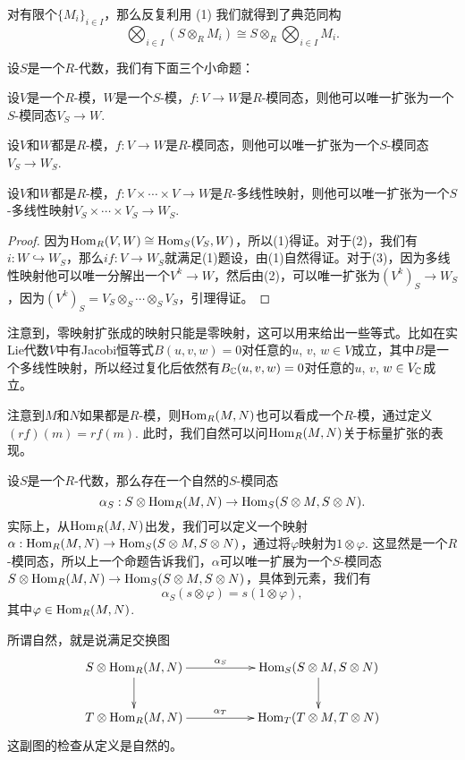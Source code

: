 对有限个$\{M_i\}_{i\in I}$，那么反复利用 (1) 我们就得到了典范同构
\[
	\bigotimes_{i\in I} \left(S\otimes_RM_i\right)\cong S\otimes_R\bigotimes_{i\in I} M_i.
\]

\begin{pro}
设$S$是一个$R$-代数，我们有下面三个小命题：
\begin{compactenum}[~~~(1)]
\item 设$V$是一个$R$-模，$W$是一个$S$-模，$f:V\to W$是$R$-模同态，则他可以唯一扩张为一个$S$-模同态$V_S\to W$.
\item 设$V$和$W$都是$R$-模，$f:V\to W$是$R$-模同态，则他可以唯一扩张为一个$S$-模同态$V_S\to W_S$.
\item 设$V$和$W$都是$R$-模，$f:V\times\cdots\times V\to W$是$R$-多线性映射，则他可以唯一扩张为一个$S$-多线性映射$V_S\times\cdots\times V_S\to W_S$.
\end{compactenum}
\end{pro}

\begin{proof} 
	因为$\operatorname{Hom}_R(V,W)\cong \operatorname{Hom}_S(V_S,W)$，所以(1)得证。对于(2)，我们有$i:W\hookrightarrow W_S$，那么$if:V\to W_S$就满足(1)题设，由(1)自然得证。对于(3)，因为多线性映射他可以唯一分解出一个$V^k\to W$，然后由(2)，可以唯一扩张为$(V^k)_S\to W_S$，因为$(V^k)_S=V_S\otimes_S \cdots\otimes_S V_S$，引理得证。
\end{proof}

注意到，零映射扩张成的映射只能是零映射，这可以用来给出一些等式。比如在实Lie代数$V$中有Jacobi恒等式$B(u,v,w)=0$对任意的$u$, $v$, $w\in V$成立，其中$B$是一个多线性映射，所以经过复化后依然有$B_{\mathbb{C}} (u,v,w)=0$对任意的$u$, $v$, $w\in V_{\mathbb{C}}$成立。

\para 注意到$M$和$N$如果都是$R$-模，则$\operatorname{Hom}_R(M,N)$也可以看成一个$R$-模，通过定义$(rf)(m)=rf(m)$. 此时，我们自然可以问$\operatorname{Hom}_R(M,N)$关于标量扩张的表现。

设$S$是一个$R$-代数，那么存在一个自然的$S$-模同态
\[
	\alpha_S:S\otimes\operatorname{Hom}_R(M,N)\to \operatorname{Hom}_S(S\otimes M,S\otimes N).
\]
实际上，从$\operatorname{Hom}_R(M,N)$出发，我们可以定义一个映射$\alpha:\operatorname{Hom}_R(M,N)\to \operatorname{Hom}_S(S\otimes M,S\otimes N)$，通过将$\varphi$映射为$1\otimes \varphi$. 这显然是一个$R$-模同态，所以上一个命题告诉我们，$\alpha$可以唯一扩展为一个$S$-模同态$S\otimes\operatorname{Hom}_R(M,N)\to \operatorname{Hom}_S(S\otimes M,S\otimes N)$，具体到元素，我们有
\[
	\alpha_S(s\otimes \varphi)=s(1\otimes \varphi),
\]
其中$\varphi\in \operatorname{Hom}_R(M,N)$.

所谓自然，就是说满足交换图
\[
\begin{xy}
	\xymatrix
	{
		S\otimes\Hom_R(M,N)\ar[rr]^-{\alpha_S}\ar[d]&&\Hom_S(S\otimes M,S\otimes N)\ar[d]\\
		T\otimes\Hom_R(M,N)\ar[rr]^-{\alpha_T}&&\Hom_T(T\otimes M,T\otimes N)
	}
\end{xy}
\]
这副图的检查从定义是自然的。

